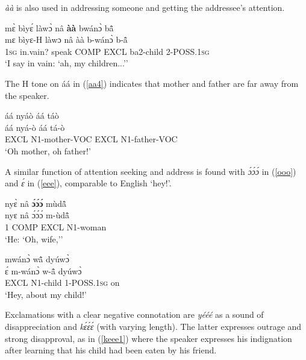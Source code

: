 {\itshape àà} is also used in addressing someone and getting the addressee's attention.

\begin{exe} 
\ex\label{8aa3}
  \glll   mɛ̀ bìyɛ́ làwɔ̀ nâ {\bfseries àà} bwánɔ̀ bã̂ \\
           mɛ bìyɛ-H làwɔ nâ àà b-wánɔ̀ b-ã̂ \\
          1\textsc{sg} in.vain? speak COMP EXCL ba2-child 2-POSS.1\textsc{sg} \\
    \trans `I say in vain: `ah, my children...''
\end{exe}

\noindent The H tone on {áá} in (\ref{aa4}) indicates that mother and father are far away from the speaker.

\begin{exe} 
\ex\label{aa4}
  \glll áá nyáò áá táò \\
       áá nyá-ò áá tá-ò \\
       EXCL N1-mother-VOC EXCL N1-father-VOC  \\
    \trans `Oh mother, oh father!'
\end{exe}

A similar function of attention seeking and address is found with {\itshape ɔ́ɔ́ɔ́} in (\ref{ooo}) and {\itshape ɛ́} in (\ref{eee}), comparable to English `hey!'.

\begin{exe} 
\ex\label{ooo}
  \glll  nyɛ̀ nâ {\bfseries ɔ́ɔ́ɔ́} mùdã̂ \\
          nyɛ nâ ɔ́ɔ́ɔ́ m-ùdã̂ \\
            1 COMP EXCL N1-woman  \\
    \trans `He: `Oh, wife,''
\end{exe}

\begin{exe} 
\ex\label{eee}
   mwánɔ̀ wã̂ dyúwɔ̀ \\
       ɛ́ m-wánɔ̀ w-ã̂ dyúwɔ̀ \\
        EXCL N1-child 1-POSS.1\textsc{sg} on \\
    \trans `Hey, about my child!'
\end{exe}

Exclamations with a clear negative connotation are {\itshape yééé} as a sound of disappreciation and {\itshape kɛ́ɛ́ɛ́} (with varying length). The latter expresses outrage and strong disapproval, as in (\ref{keee1}) where the speaker expresses his indignation after learning that his child had been eaten by his friend.

